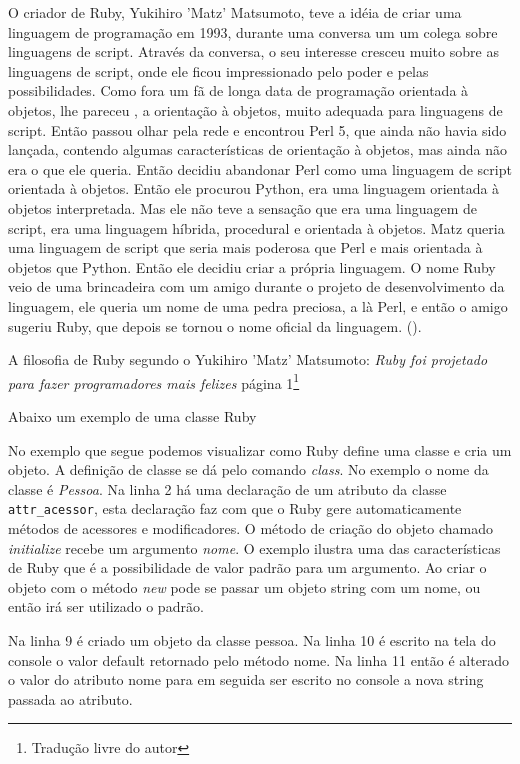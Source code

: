 O criador de Ruby, Yukihiro 'Matz' Matsumoto, teve a idéia de criar uma linguagem de programação em 1993, durante uma conversa um um colega sobre linguagens de script. Através da conversa, o seu interesse cresceu muito sobre as linguagens de script, onde ele ficou impressionado pelo poder e pelas possibilidades. Como fora um fã de longa data de programação orientada à objetos, lhe pareceu , a orientação à objetos, muito adequada para linguagens de script. Então passou olhar pela rede e encontrou Perl 5, que ainda não havia sido lançada, contendo algumas características de orientação à objetos, mas ainda não era o que ele queria. Então decidiu abandonar Perl como uma linguagem de script orientada à objetos. Então ele procurou Python, era uma linguagem orientada à objetos interpretada. Mas ele não teve a sensação que era uma linguagem de script, era uma linguagem híbrida, procedural e orientada à objetos. Matz queria uma linguagem de script que seria mais poderosa que Perl e mais orientada à objetos que Python. Então ele decidiu criar a própria linguagem. O nome Ruby veio de uma brincadeira com um amigo durante o projeto de desenvolvimento da linguagem, ele queria um nome de uma pedra preciosa, a là Perl, e então o amigo sugeriu Ruby, que depois se tornou o nome oficial da linguagem.  (\cite{interview_with_matz}).

A filosofia de Ruby segundo o Yukihiro 'Matz' Matsumoto: \emph{Ruby foi projetado para fazer programadores mais felizes}
\cite{the_ruby_programming_language}{página 1}\footnote{Tradução livre do autor}

Abaixo um exemplo de uma classe Ruby 

No exemplo que segue podemos visualizar como Ruby define uma classe e cria um objeto. A definição de classe se dá pelo comando \emph{class}. No exemplo o nome da classe é \emph{Pessoa}. Na linha 2 há uma declaração de um atributo da classe \verb+attr_acessor+, esta declaração faz com que o Ruby gere automaticamente métodos de acessores e modificadores.  O método de criação do objeto chamado \emph{initialize} recebe um argumento \emph{nome}. O exemplo ilustra uma das características de Ruby que é a possibilidade de valor padrão para um argumento. Ao criar o objeto com o método \emph{new} pode se passar um objeto string com um nome, ou então irá ser utilizado o padrão. 

Na linha 9 é criado um objeto da classe pessoa. Na linha 10 é escrito na tela do console o valor default retornado pelo método nome. Na linha 11 então é alterado o valor do atributo nome para em seguida ser escrito no console a nova string passada ao atributo. 


